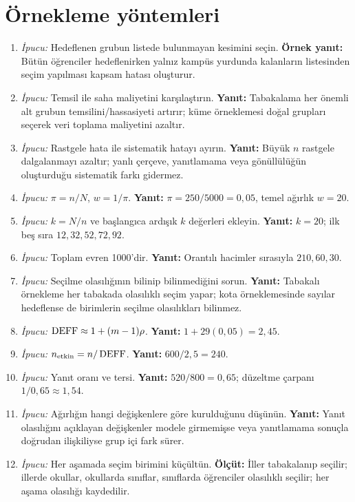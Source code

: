 \section{Örnekleme yöntemleri}

\begin{enumerate}[leftmargin=*,itemsep=5pt]
\item \emph{İpucu:} Hedeflenen grubun listede bulunmayan kesimini seçin.
\textbf{Örnek yanıt:} Bütün öğrenciler hedeflenirken yalnız kampüs yurdunda
kalanların listesinden seçim yapılması kapsam hatası oluşturur.
\item \emph{İpucu:} Temsil ile saha maliyetini karşılaştırın.
\textbf{Yanıt:} Tabakalama her önemli alt grubun temsilini/hassasiyeti artırır;
küme örneklemesi doğal grupları seçerek veri toplama maliyetini azaltır.
\item \emph{İpucu:} Rastgele hata ile sistematik hatayı ayırın.
\textbf{Yanıt:} Büyük $n$ rastgele dalgalanmayı azaltır; yanlı çerçeve,
yanıtlamama veya gönüllülüğün oluşturduğu sistematik farkı gidermez.
\item \emph{İpucu:} $\pi=n/N$, $w=1/\pi$.
\textbf{Yanıt:} $\pi=250/5000=0{,}05$, temel ağırlık $w=20$.
\item \emph{İpucu:} $k=N/n$ ve başlangıca ardışık $k$ değerleri ekleyin.
\textbf{Yanıt:} $k=20$; ilk beş sıra $12,32,52,72,92$.
\item \emph{İpucu:} Toplam evren 1000'dir.
\textbf{Yanıt:} Orantılı hacimler sırasıyla $210,60,30$.
\item \emph{İpucu:} Seçilme olasılığının bilinip bilinmediğini sorun.
\textbf{Yanıt:} Tabakalı örnekleme her tabakada olasılıklı seçim yapar; kota
örneklemesinde sayılar hedeflense de birimlerin seçilme olasılıkları bilinmez.
\item \emph{İpucu:} $\operatorname{DEFF}\approx1+(m-1)\rho$.
\textbf{Yanıt:} $1+29(0{,}05)=2{,}45$.
\item \emph{İpucu:} $n_{\rm etkin}=n/\operatorname{DEFF}$.
\textbf{Yanıt:} $600/2{,}5=240$.
\item \emph{İpucu:} Yanıt oranı ve tersi.
\textbf{Yanıt:} $520/800=0{,}65$; düzeltme çarpanı $1/0{,}65\approx1{,}54$.
\item \emph{İpucu:} Ağırlığın hangi değişkenlere göre kurulduğunu düşünün.
\textbf{Yanıt:} Yanıt olasılığını açıklayan değişkenler modele girmemişse veya
yanıtlamama sonuçla doğrudan ilişkiliyse grup içi fark sürer.
\item \emph{İpucu:} Her aşamada seçim birimini küçültün.
\textbf{Ölçüt:} İller tabakalanıp seçilir; illerde okullar, okullarda sınıflar,
sınıflarda öğrenciler olasılıklı seçilir; her aşama olasılığı kaydedilir.
\end{enumerate}

